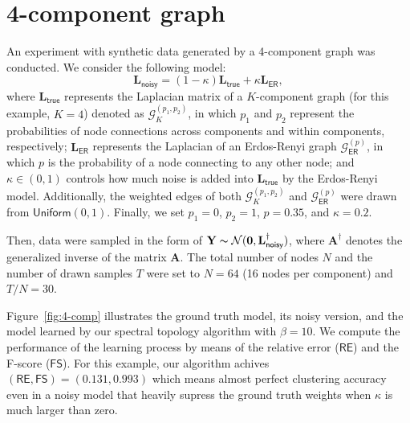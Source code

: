 \documentclass{article}
\begin{document}
\section{4-component graph}
An experiment with synthetic data generated by a 4-component graph was conducted.
We consider the following model:
\begin{equation}
  \mathbf{L}_{\mathsf{noisy}} = (1 - \kappa) \mathbf{L}_{\mathsf{true}} + \kappa \mathbf{L}_{\mathsf{ER}},
  \label{eq:model}
\end{equation}
where $\mathbf{L}_{\mathsf{true}}$ represents the Laplacian matrix of a $K$-component graph (for this example, $K = 4$)
denoted as $\mathcal{G}^{(p_1, p_2)}_K$,
in which $p_1$ and $p_2$ represent the probabilities of node connections across components and within components, respectively;
$\mathbf{L}_{\mathsf{ER}}$ represents the Laplacian of an Erdos-Renyi graph $\mathcal{G}^{(p)}_{\mathsf{ER}}$, in which $p$
is the probability of a node connecting to any other node; and $\kappa \in (0, 1)$ controls how much noise is added into
$\mathbf{L}_{\mathsf{true}}$ by the Erdos-Renyi model. Additionally, the weighted edges of both $\mathcal{G}^{(p_1, p_2)}_K$
and $\mathcal{G}^{(p)}_{\mathsf{ER}}$ were drawn from $\textsf{Uniform}(0, 1)$. Finally, we set $p_1 = 0$, $p_2 = 1$,
$p = 0.35$, and $\kappa = 0.2$.

Then, data were sampled in the form of $\mathbf{Y} \thicksim \mathcal{N}(\mathbf{0}, \mathbf{L}_{\mathsf{noisy}}^{\dagger})$,
where $\mathbf{A}^{\dagger}$ denotes the generalized inverse of the matrix $\mathbf{A}$. The total number of nodes $N$
and the number of drawn samples $T$ were set to $N = 64$ (16 nodes per component) and $T / N = 30$.

Figure~\ref{fig:4-comp} illustrates the ground truth model, its noisy version, and the model learned by our spectral
topology algorithm with $\beta = 10$. We compute the performance of the learning process by means of the relative error
($\textsf{RE}$) and the F-score ($\textsf{FS}$). For this example, our algorithm achives $(\mathsf{RE}, \mathsf{FS}) = (0.131, 0.993)$
which means almost perfect clustering accuracy even in a noisy model that heavily supress the ground truth weights when $\kappa$ is much
larger than zero.
\end{document}
